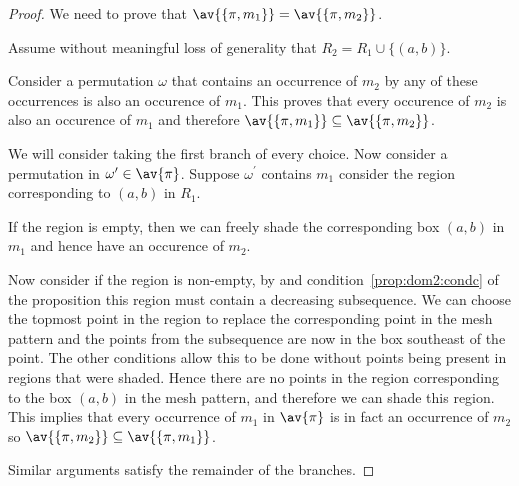 \begin{proof}
    We need to prove that \(\av{\{\pi,m_1\}} = \av{\{\pi,m_2\}}\).

    Assume without meaningful loss of generality that \(R_2 = R_1 \cup \{(a,b)\}\).

    Consider a permutation \(\omega\) that contains an occurrence of \(m_2\)
    by  any of these occurrences is also an occurence
    of \(m_1\). This proves that every occurence of \(m_2\) is also an
    occurence of \(m_1\) and therefore \(\av{\{\pi,m_1\}} \subseteq \av{\{\pi,m_2\}}\).

    We will consider taking the first branch of every choice.
    Now consider a permutation in \(\omega^\prime \in \av{\pi}\). Suppose
    \(\omega^\prime\) contains \(m_1\) consider the region corresponding to
    \((a,b)\) in \(R_1\).

    If the region is empty, then we can freely shade the corresponding
    box \((a,b)\) in \(m_1\) and hence have an occurence of \(m_2\).

    Now consider if the region is non-empty, by  and
    condition~\ref{prop:dom2:condc} of the proposition this region must contain
    a decreasing subsequence.
    We can choose the topmost point in the region to replace the corresponding
    point in the mesh pattern and the points from the subsequence are now in
    the box southeast of the point. The other conditions allow this to be done
    without points being present in regions that were shaded. Hence there are no
    points in the region corresponding to the box \((a,b)\) in the mesh
    pattern, and therefore we can shade this region. This implies that every
    occurrence of \(m_1\) in \(\av{\pi}\) is in fact an occurrence of \(m_2\)
    so \(\av{\{\pi,m_2\}} \subseteq \av{\{\pi,m_1\}}\).

    Similar arguments satisfy the remainder of the branches.

\end{proof}
